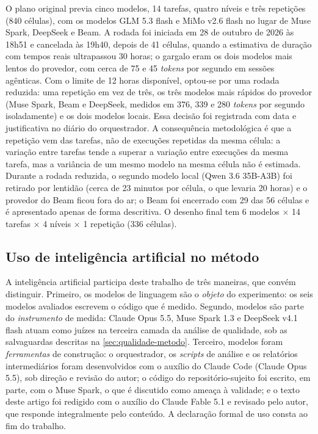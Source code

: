 O plano original previa cinco modelos, 14 tarefas, quatro níveis e três
repetições (840 células), com os modelos GLM 5.3 flash e MiMo v2.6 flash no
lugar de Muse Spark, DeepSeek e Beam. A rodada foi iniciada em 28 de outubro
de 2026 às 18h51 e cancelada às 19h40, depois de 41 células, quando a
estimativa de duração com tempos reais ultrapassou 30 horas; o gargalo eram os
dois modelos mais lentos do provedor, com cerca de 75 e 45 \textit{tokens} por
segundo em sessões agênticas. Com o limite de 12 horas disponível, optou-se
por uma rodada reduzida: uma repetição em vez de três, os três modelos mais
rápidos do provedor (Muse Spark, Beam e DeepSeek, medidos em 376, 339 e 280
\textit{tokens} por segundo isoladamente) e os dois modelos locais. Essa
decisão foi registrada com data e justificativa no diário do orquestrador. A
consequência metodológica é que a repetição vem das tarefas, não de execuções
repetidas da mesma célula: a variação entre tarefas tende a superar a variação
entre execuções da mesma tarefa, mas a variância de um mesmo modelo na mesma
célula não é estimada. Durante a rodada reduzida, o segundo modelo local (Qwen
3.6 35B-A3B) foi retirado por lentidão (cerca de 23 minutos por célula, o que
levaria 20 horas) e o provedor do Beam ficou fora do ar; o Beam foi encerrado
com 29 das 56 células e é apresentado apenas de forma descritiva. O desenho
final tem 6 modelos $\times$ 14 tarefas $\times$ 4 níveis $\times$ 1 repetição
(336 células).

\subsection{Uso de inteligência artificial no método}
\label{sec:uso-ia}

A inteligência artificial participa deste trabalho de três maneiras, que
convém distinguir. Primeiro, os modelos de linguagem são o \emph{objeto} do
experimento: os seis modelos avaliados escrevem o código que é medido.
Segundo, modelos são parte do \emph{instrumento} de medida: Claude Opus 5.5,
Muse Spark 1.3 e DeepSeek v4.1 flash atuam como juízes na terceira camada da
análise de qualidade, sob as salvaguardas descritas na
\autoref{sec:qualidade-metodo}. Terceiro, modelos foram \emph{ferramentas} de
construção: o orquestrador, os \textit{scripts} de análise e os relatórios
intermediários foram desenvolvidos com o auxílio do Claude Code (Claude Opus
5.5), sob direção e revisão do autor; o código do repositório-sujeito foi
escrito, em parte, com o Muse Spark, o que é discutido como ameaça à validade;
e o texto deste artigo foi redigido com o auxílio do Claude Fable 5.1 e revisado
pelo autor, que responde integralmente pelo conteúdo. A declaração formal de uso
consta ao fim do trabalho.
